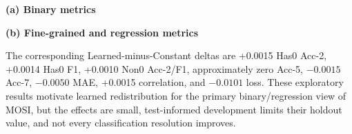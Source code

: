 \begin{table}[t]
\caption{Clean CMU-MOSI performance (mean $\pm$ sample standard deviation
over seeds 1111, 1112, and 1113). Bold marks the better value between the
two equal-budget P4 variants; tied Acc-5 values are both bold.}
\label{tab:mosi-results}
\centering
\small
\textbf{(a) Binary metrics}\par\smallskip
{}

\vspace{0.7em}
\textbf{(b) Fine-grained and regression metrics}\par\smallskip
{}
\end{table}

The corresponding Learned-minus-Constant deltas are +0.0015 Has0 Acc-2,
+0.0014 Has0 F1, +0.0010 Non0 Acc-2/F1, approximately zero Acc-5,
\(-0.0015\) Acc-7, \(-0.0050\) MAE, +0.0015 correlation, and \(-0.0101\)
loss. These exploratory results motivate learned redistribution for the
primary binary/regression view of MOSI, but the effects are small,
test-informed development limits their holdout value, and not every
classification resolution improves.

